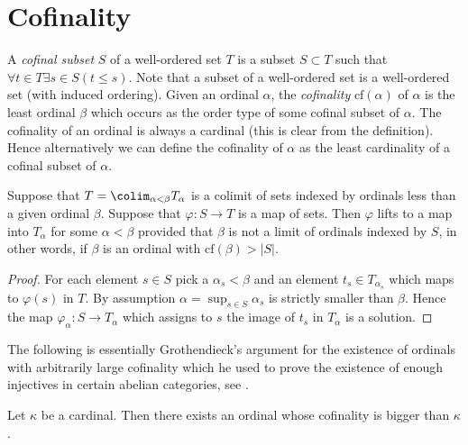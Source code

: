 \section{Cofinality}
\label{section-cofinality}

\noindent
A {\it cofinal subset} $S$ of a well-ordered set $T$ is a subset
$S \subset T$ such that $\forall t \in T \exists s\in S (t \leq s)$.
Note that a subset of a well-ordered set is a well-ordered set
(with induced ordering). Given an ordinal $\alpha$, the {\it cofinality}
$\text{cf}(\alpha)$ of $\alpha$ is the least ordinal $\beta$
which occurs as the order type of some cofinal subset of $\alpha$.
The cofinality of an ordinal is always a cardinal (this is clear from
the definition). Hence alternatively we can define the cofinality of
$\alpha$ as the least cardinality of a cofinal subset of $\alpha$.

\begin{lemma}
\label{lemma-map-from-set-lifts}
Suppose that $T = \colim_{\alpha < \beta} T_\alpha$
is a colimit of sets indexed by ordinals less than a given ordinal $\beta$.
Suppose that $\varphi : S \to T$ is a map of sets.
Then $\varphi$ lifts to a map into $T_\alpha$ for some $\alpha < \beta$
provided that $\beta$ is not a limit of ordinals indexed by $S$,
in other words, if $\beta$ is an ordinal with $\text{cf}(\beta) > |S|$.
\end{lemma}

\begin{proof}
For each element $s \in S$ pick a $\alpha_s < \beta$ and an element
$t_s \in T_{\alpha_s}$ which maps to $\varphi(s)$ in $T$.
By assumption $\alpha = \sup_{s \in S} \alpha_s$ is strictly smaller
than $\beta$. Hence the map $\varphi_\alpha : S \to T_\alpha$
which assigns to $s$ the image of $t_s$ in $T_\alpha$ is a solution.
\end{proof}

\noindent
The following is essentially Grothendieck's argument for the existence
of ordinals with arbitrarily large cofinality which he used to prove
the existence of enough injectives in certain abelian categories, see
\cite{Tohoku}.

\begin{proposition}
\label{proposition-exist-ordinals-large-cofinality}
Let $\kappa$ be a cardinal. Then there exists an ordinal
whose cofinality is bigger than $\kappa$.
\end{proposition}

